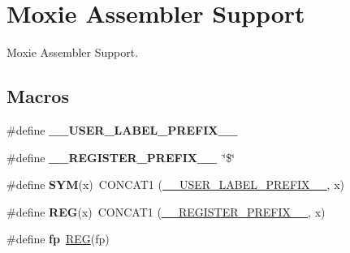 \hypertarget{group__RTEMSScoreCPUMoxieASM}{}\section{Moxie Assembler Support}
\label{group__RTEMSScoreCPUMoxieASM}


Moxie Assembler Support.  


\subsection*{Macros}
\begin{DoxyCompactItemize}
\item 
\mbox{\label{group__RTEMSScoreCPUMoxieASM_gaff6bf0ff0fa3b5cbd23a8ae1131c87a9}} 
\#define {\bfseries \+\_\+\+\_\+\+U\+S\+E\+R\+\_\+\+L\+A\+B\+E\+L\+\_\+\+P\+R\+E\+F\+I\+X\+\_\+\+\_\+}
\item 
\mbox{\label{group__RTEMSScoreCPUMoxieASM_ga08d4062230ffc8494f4be4f6447497e4}} 
\#define {\bfseries \+\_\+\+\_\+\+R\+E\+G\+I\+S\+T\+E\+R\+\_\+\+P\+R\+E\+F\+I\+X\+\_\+\+\_\+}~\char`\"{}\$\char`\"{}
\item 
\mbox{\label{group__RTEMSScoreCPUMoxieASM_gafe05d428a5f345f51fb591debb815325}} 
\#define {\bfseries S\+YM}(x)~C\+O\+N\+C\+A\+T1 (\mbox{\hyperlink{group__RTEMSScoreCPUx86-64ASM_gaff6bf0ff0fa3b5cbd23a8ae1131c87a9}{\+\_\+\+\_\+\+U\+S\+E\+R\+\_\+\+L\+A\+B\+E\+L\+\_\+\+P\+R\+E\+F\+I\+X\+\_\+\+\_\+}}, x)
\item 
\mbox{\label{group__RTEMSScoreCPUMoxieASM_gacee196421e9a06f7700bb3064b13b37a}} 
\#define {\bfseries R\+EG}(x)~C\+O\+N\+C\+A\+T1 (\mbox{\hyperlink{group__RTEMSScoreCPUV850ASM_ga08d4062230ffc8494f4be4f6447497e4}{\+\_\+\+\_\+\+R\+E\+G\+I\+S\+T\+E\+R\+\_\+\+P\+R\+E\+F\+I\+X\+\_\+\+\_\+}}, x)
\item 
\mbox{\label{group__RTEMSScoreCPUMoxieASM_gae771351dd440a8640270282362e338d0}} 
\#define {\bfseries fp}~\mbox{\hyperlink{group__RTEMSScoreCPUx86-64ASM_gacee196421e9a06f7700bb3064b13b37a}{R\+EG}}(fp)
\item 
\mbox{\label{group__RTEMSScoreCPUMoxieASM_ga8d40798874dab99986478ef00ff3e297}} 

\end{DoxyCompactItemize}
